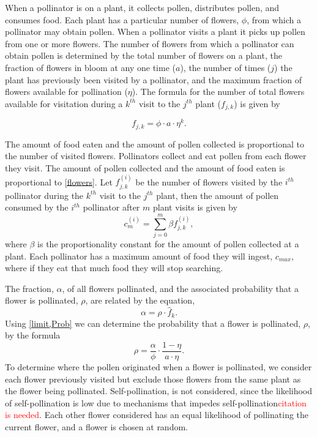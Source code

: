 When a pollinator is on a plant, it collects pollen, distributes pollen, and
consumes food. Each plant has a particular number of flowers, $\phi$, from which
a pollinator may obtain pollen. When a pollinator visits a plant it picks up
pollen from one or more flowers. The number of flowers from which a pollinator
can obtain pollen is determined by the total number of flowers on a plant, the
fraction of flowers in bloom at any one time ($a$), the number of times ($j$)
the plant has previously been visited by a pollinator, and the maximum fraction
of flowers available for pollination ($\eta$). The formula for the number of
total flowers available for visitation during a $k^{th}$ visit to the $j^{th}$
plant ($f_{j,k}$) is given by

\begin{equation}\label{flowers}
f_{j,k} = \phi \cdot a \cdot \eta^k.
\end{equation}

The amount of food eaten and the amount of pollen collected is proportional to
the number of visited flowers. Pollinators collect and eat pollen from each
flower they visit.  The amount of pollen collected and the amount of food eaten
is proportional to \cref{flowers}. Let $f^{\left(i\right)}_{j,k}$
be the number of flowers visited by the $i^{th}$ pollinator during the $k^{th}$
visit to the $j^{th}$ plant, then the amount of pollen consumed by the $i^{th}$
pollinator after $m$ plant visits is given by 
\begin{equation}
  c^{\left(i\right)}_m = \sum_{j=0}^{m} \beta f^{\left(i\right)}_{j,k},
  \label{limit}
\end{equation}
where $\beta$ is the proportionality constant for
the amount of pollen collected at a plant.  Each pollinator has a maximum amount
of food they will ingest, $c_{max}$, where if they eat that much food they will
stop searching.

The fraction, $\alpha$, of all flowers pollinated, and the associated
probability that a flower is pollinated, $\rho$, are related by the equation,
\begin{equation} \label{Prob}
  \alpha = \rho \cdot \hat{f}_k.
\end{equation}
Using \cref{limit,Prob} we can determine the probability
that a flower is pollinated, $\rho$, by the formula
\begin{equation*}
  \rho = \frac{\alpha}{\phi} \cdot \frac{1 - \eta}{a \cdot \eta}.
\end{equation*}
To determine where the pollen originated when a flower is pollinated, we
consider each flower previously visited but exclude those flowers from the same
plant as the flower being pollinated.    Self-pollination, is not considered,
since the likelihood of self-pollination is low due to mechanisms that impedes
self-pollination\textcolor{red}{citation is needed}. Each other flower
considered has an equal likelihood of pollinating the current flower, and a
flower is chosen at random.

